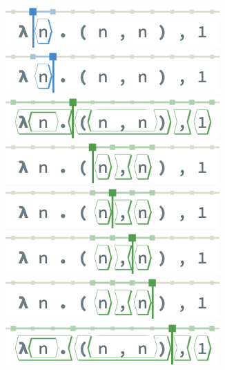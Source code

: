 \begin{figure}
\begin{subfigure}[c]{0.25\textwidth}
    \includegraphics[width=0.9\textwidth]{img/pan-tiles-1.png}
    \includegraphics[width=0.9\textwidth]{img/pan-tiles-2.png}
    \includegraphics[width=0.9\textwidth]{img/pan-tiles-3.png}
    \includegraphics[width=0.9\textwidth]{img/pan-tiles-4.png}
    \includegraphics[width=0.9\textwidth]{img/pan-tiles-5.png}
    \includegraphics[width=0.9\textwidth]{img/pan-tiles-6.png}
    \includegraphics[width=0.9\textwidth]{img/pan-tiles-7.png}
    \includegraphics[width=0.9\textwidth]{img/pan-tiles-8.png}

\end{subfigure}
\end{figure}
